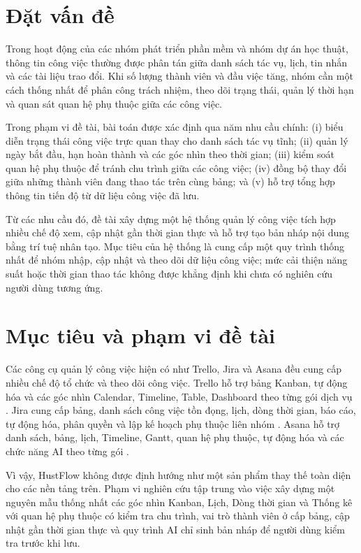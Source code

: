 \documentclass[../DoAn.tex]{subfiles}
\begin{document}
\section{Đặt vấn đề}
\label{section:1.1}
Trong hoạt động của các nhóm phát triển phần mềm và nhóm dự án học thuật, thông tin công việc thường được phân tán giữa danh sách tác vụ, lịch, tin nhắn và các tài liệu trao đổi. Khi số lượng thành viên và đầu việc tăng, nhóm cần một cách thống nhất để phân công trách nhiệm, theo dõi trạng thái, quản lý thời hạn và quan sát quan hệ phụ thuộc giữa các công việc.

Trong phạm vi đề tài, bài toán được xác định qua năm nhu cầu chính: (i) biểu diễn trạng thái công việc trực quan thay cho danh sách tác vụ tĩnh; (ii) quản lý ngày bắt đầu, hạn hoàn thành và các góc nhìn theo thời gian; (iii) kiểm soát quan hệ phụ thuộc để tránh chu trình giữa các công việc; (iv) đồng bộ thay đổi giữa những thành viên đang thao tác trên cùng bảng; và (v) hỗ trợ tổng hợp thông tin tiến độ từ dữ liệu công việc đã lưu.

Từ các nhu cầu đó, đề tài xây dựng một hệ thống quản lý công việc tích hợp nhiều chế độ xem, cập nhật gần thời gian thực và hỗ trợ tạo bản nháp nội dung bằng trí tuệ nhân tạo. Mục tiêu của hệ thống là cung cấp một quy trình thống nhất để nhóm nhập, cập nhật và theo dõi dữ liệu công việc; mức cải thiện năng suất hoặc thời gian thao tác không được khẳng định khi chưa có nghiên cứu người dùng tương ứng.

\section{Mục tiêu và phạm vi đề tài}
\label{section:1.2}
Các công cụ quản lý công việc hiện có như Trello, Jira và Asana đều cung cấp nhiều chế độ tổ chức và theo dõi công việc. Trello hỗ trợ bảng Kanban, tự động hóa và các góc nhìn Calendar, Timeline, Table, Dashboard theo từng gói dịch vụ \cite{trelloofficial}. Jira cung cấp bảng, danh sách công việc tồn đọng, lịch, dòng thời gian, báo cáo, tự động hóa, phân quyền và lập kế hoạch phụ thuộc liên nhóm \cite{jiraofficial}. Asana hỗ trợ danh sách, bảng, lịch, Timeline, Gantt, quan hệ phụ thuộc, tự động hóa và các chức năng AI theo từng gói \cite{asanaofficial}.

Vì vậy, HustFlow không được định hướng như một sản phẩm thay thế toàn diện cho các nền tảng trên. Phạm vi nghiên cứu tập trung vào việc xây dựng một nguyên mẫu thống nhất các góc nhìn Kanban, Lịch, Dòng thời gian và Thống kê với quan hệ phụ thuộc có kiểm tra chu trình, vai trò thành viên ở cấp bảng, cập nhật gần thời gian thực và quy trình AI chỉ sinh bản nháp để người dùng kiểm tra trước khi lưu.
\end{document}
